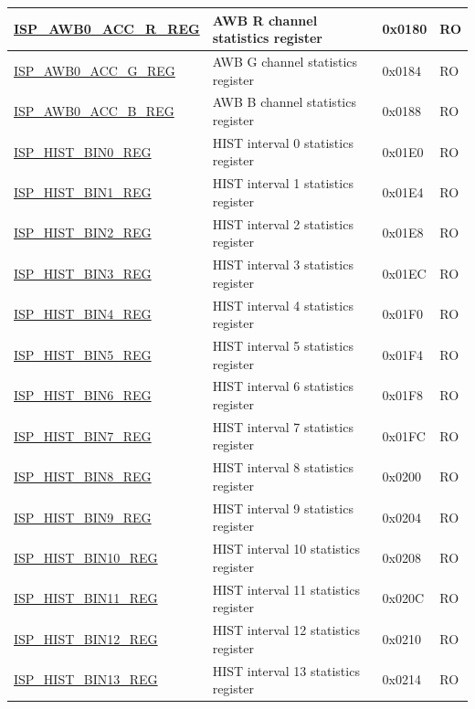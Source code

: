 \begin{longtable}{ | p{6cm} | p{7.2cm} | p{1.3cm} | p{1cm} | }
\hyperref[regdesc:ISPAWB0ACCRREG]{ISP\_AWB0\_ACC\_R\_REG} & AWB R channel statistics register & 0x0180 & RO \\ \hline
\hyperref[regdesc:ISPAWB0ACCGREG]{ISP\_AWB0\_ACC\_G\_REG} & AWB G channel statistics register & 0x0184 & RO \\ \hline
\hyperref[regdesc:ISPAWB0ACCBREG]{ISP\_AWB0\_ACC\_B\_REG} & AWB B channel statistics register & 0x0188 & RO \\ \hline
\hyperref[regdesc:ISPHISTBIN0REG]{ISP\_HIST\_BIN0\_REG} & HIST interval 0 statistics register  & 0x01E0 & RO \\ \hline
\hyperref[regdesc:ISPHISTBIN1REG]{ISP\_HIST\_BIN1\_REG} & HIST interval 1 statistics register  & 0x01E4 & RO \\ \hline
\hyperref[regdesc:ISPHISTBIN2REG]{ISP\_HIST\_BIN2\_REG} & HIST interval 2 statistics register  & 0x01E8 & RO \\ \hline
\hyperref[regdesc:ISPHISTBIN3REG]{ISP\_HIST\_BIN3\_REG} & HIST interval 3 statistics register  & 0x01EC & RO \\ \hline
\hyperref[regdesc:ISPHISTBIN4REG]{ISP\_HIST\_BIN4\_REG} & HIST interval 4 statistics register  & 0x01F0 & RO \\ \hline
\hyperref[regdesc:ISPHISTBIN5REG]{ISP\_HIST\_BIN5\_REG} & HIST interval 5 statistics register  & 0x01F4 & RO \\ \hline
\hyperref[regdesc:ISPHISTBIN6REG]{ISP\_HIST\_BIN6\_REG} & HIST interval 6 statistics register  & 0x01F8 & RO \\ \hline
\hyperref[regdesc:ISPHISTBIN7REG]{ISP\_HIST\_BIN7\_REG} & HIST interval 7 statistics register  & 0x01FC & RO \\ \hline
\hyperref[regdesc:ISPHISTBIN8REG]{ISP\_HIST\_BIN8\_REG} & HIST interval 8 statistics register  & 0x0200 & RO \\ \hline
\hyperref[regdesc:ISPHISTBIN9REG]{ISP\_HIST\_BIN9\_REG} & HIST interval 9 statistics register  & 0x0204 & RO \\ \hline
\hyperref[regdesc:ISPHISTBIN10REG]{ISP\_HIST\_BIN10\_REG} & HIST interval 10 statistics register  & 0x0208 & RO \\ \hline
\hyperref[regdesc:ISPHISTBIN11REG]{ISP\_HIST\_BIN11\_REG} & HIST interval 11 statistics register  & 0x020C & RO \\ \hline
\hyperref[regdesc:ISPHISTBIN12REG]{ISP\_HIST\_BIN12\_REG} & HIST interval 12 statistics register  & 0x0210 & RO \\ \hline
\hyperref[regdesc:ISPHISTBIN13REG]{ISP\_HIST\_BIN13\_REG} & HIST interval 13 statistics register  & 0x0214 & RO \\ \hline

\end{longtable}
